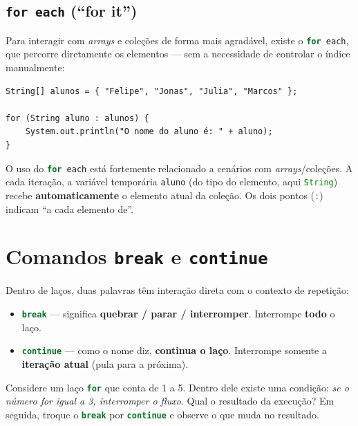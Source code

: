 \documentclass[12pt,a4paper]{article}
\newcommand{\codigo}[1]{\lstinline[language=Java,basicstyle=\ttfamily\small]|#1|}
\begin{document}
\subsection{\texttt{for each} (``for it'')}

Para interagir com \emph{arrays} e coleções de forma mais agradável, existe o
\codigo{for each}, que percorre diretamente os elementos --- sem a necessidade de
controlar o índice manualmente:

\begin{lstlisting}[caption={Exemplo de \texttt{for each}}]
String[] alunos = { "Felipe", "Jonas", "Julia", "Marcos" };

for (String aluno : alunos) {
    System.out.println("O nome do aluno é: " + aluno);
}
\end{lstlisting}

O uso do \codigo{for each} está fortemente relacionado a cenários com
\emph{arrays}/coleções. A cada iteração, a variável temporária \codigo{aluno}
(do tipo do elemento, aqui \codigo{String}) recebe \textbf{automaticamente} o
elemento atual da coleção. Os dois pontos (\codigo{:}) indicam ``a cada elemento
de''.

\section{Comandos \texttt{break} e \texttt{continue}}

Dentro de laços, duas palavras têm interação direta com o contexto de repetição:

\begin{itemize}
  \item \codigo{break} --- significa \textbf{quebrar / parar / interromper}.
        Interrompe \textbf{todo} o laço.
  \item \codigo{continue} --- como o nome diz, \textbf{continua o laço}.
        Interrompe somente a \textbf{iteração atual} (pula para a próxima).
\end{itemize}

\begin{enunciado}
Considere um laço \codigo{for} que conta de 1 a 5. Dentro dele existe uma
condição: \emph{se o número for igual a 3, interromper o fluxo}. Qual o resultado
da execução? Em seguida, troque o \codigo{break} por \codigo{continue} e observe
o que muda no resultado.
\end{enunciado}
\end{document}
